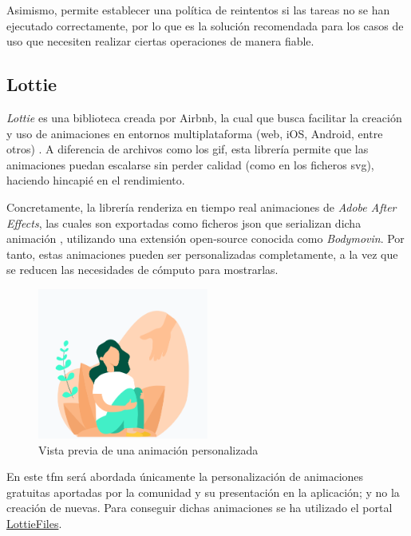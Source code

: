         Asimismo, permite establecer una política de reintentos si las tareas no se han ejecutado correctamente, por lo que es la solución recomendada para los casos de uso que necesiten realizar ciertas operaciones de manera fiable.

    \subsection{Lottie}
        \textit{Lottie} es una biblioteca creada por Airbnb, la cual que busca facilitar la creación y uso de animaciones en entornos multiplataforma (web, iOS, Android, entre otros) \cite{rubianes_lottie_2021}. A diferencia de archivos como los \gls{gif}, esta librería permite que las animaciones puedan escalarse sin perder calidad (como en los ficheros \gls{svg}), haciendo hincapié en el rendimiento.

        Concretamente, la librería renderiza en tiempo real animaciones de \textit{Adobe After Effects}, las cuales son exportadas como ficheros \gls{json} que serializan dicha animación \cite{airbnb_design_lottie_nodate}, utilizando una extensión \gls{open-source} conocida como \textit{Bodymovin}. Por tanto, estas animaciones pueden ser personalizadas completamente, a la vez que se reducen las necesidades de cómputo para mostrarlas. 
        
        \begin{figure}[h]
            \centering
            \includegraphics[width=0.5\textwidth]{figures/Animacion de ejemplo.PNG}
            \caption{Vista previa de una animación personalizada}
            \label{figure:lottie:animacion_ejemplo}
        \end{figure}

        En este \gls{tfm} será abordada únicamente la personalización de animaciones gratuitas aportadas por la comunidad y su presentación en la aplicación; y no la creación de nuevas. Para conseguir dichas animaciones se ha utilizado el portal \href{https://lottiefiles.com/}{LottieFiles}.


